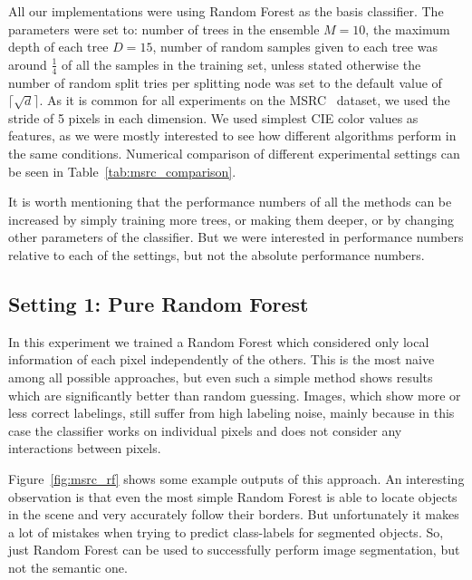 All our implementations were using Random Forest as the basis classifier. The parameters were set to: number of trees in the ensemble $M = 10$,
the maximum depth of each tree $D = 15$, number of random samples given to each tree was around $\frac{1}{4}$ of all the samples in the training set,
unless stated otherwise the number of random split tries per splitting node was set to the default value of $\lceil\sqrt{d}\rceil$. As it is common
for all experiments on the MSRC~\cite{MSRC} dataset, we used the stride of 5 pixels in each dimension. We used simplest CIE color values as features,
as we were mostly interested to see how different algorithms perform in the same conditions.
Numerical comparison of different experimental settings can be seen in Table~\ref{tab:msrc_comparison}.

It is worth mentioning that the performance numbers of all the methods can be increased by simply training more trees, or making them deeper, or by
changing other parameters of the classifier. But we were interested in performance numbers relative to each of the settings, but not the absolute
performance numbers.

\subsection{Setting 1: Pure Random Forest}
\label{msrc_setting_1}
In this experiment we trained a Random Forest which considered only local information of each pixel independently of the others. This is the most naive
among all possible approaches, but even such a simple method shows results which are significantly better than random guessing. 
Images, which show more or less correct labelings, still suffer from high labeling noise, mainly because in this case the classifier works on individual
pixels and does not consider any interactions between pixels.

Figure~\ref{fig:msrc_rf} shows some example outputs of this approach. An interesting observation is that even the most simple Random Forest is able
to locate objects in the scene and very accurately follow their borders. But unfortunately it makes a lot of mistakes when trying to predict class-labels
for segmented objects. So, just Random Forest can be used to successfully perform image segmentation, but not the semantic one.

